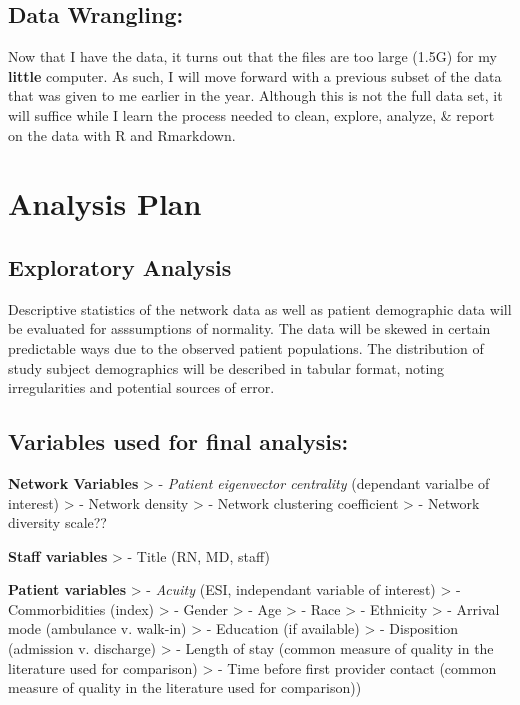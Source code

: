 \documentclass[]{elsarticle} %
\begin{document}
\subsection{Data Wrangling:}\label{data-wrangling}

Now that I have the data, it turns out that the files are too large
(1.5G) for my \textbf{little} computer. As such, I will move forward
with a previous subset of the data that was given to me earlier in the
year. Although this is not the full data set, it will suffice while I
learn the process needed to clean, explore, analyze, \& report on the
data with R and Rmarkdown.

\section{Analysis Plan}\label{analysis-plan}

\subsection{Exploratory Analysis}\label{exploratory-analysis}

Descriptive statistics of the network data as well as patient
demographic data will be evaluated for asssumptions of normality. The
data will be skewed in certain predictable ways due to the observed
patient populations. The distribution of study subject demographics will
be described in tabular format, noting irregularities and potential
sources of error.

\subsection{Variables used for final
analysis:}\label{variables-used-for-final-analysis}

\textbf{Network Variables} \textgreater{} - \emph{Patient eigenvector
centrality} (dependant varialbe of interest) \textgreater{} - Network
density \textgreater{} - Network clustering coefficient \textgreater{} -
Network diversity scale??

\textbf{Staff variables} \textgreater{} - Title (RN, MD, staff)

\textbf{Patient variables} \textgreater{} - \emph{Acuity} (ESI,
independant variable of interest) \textgreater{} - Commorbidities
(index) \textgreater{} - Gender \textgreater{} - Age \textgreater{} -
Race \textgreater{} - Ethnicity \textgreater{} - Arrival mode (ambulance
v. walk-in) \textgreater{} - Education (if available) \textgreater{} -
Disposition (admission v. discharge) \textgreater{} - Length of stay
(common measure of quality in the literature used for comparison)
\textgreater{} - Time before first provider contact (common measure of
quality in the literature used for comparison))
\end{document}
